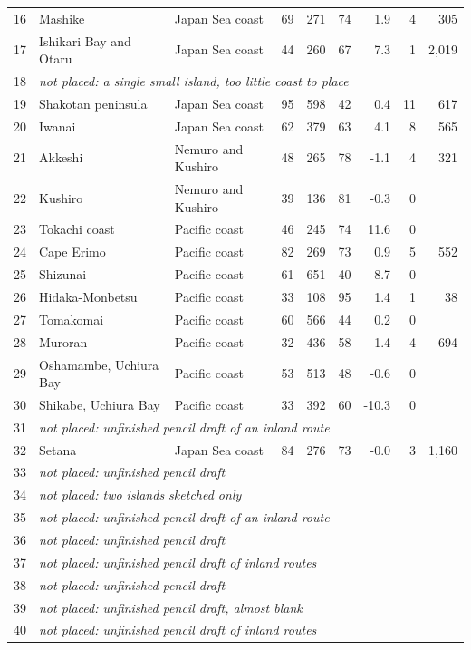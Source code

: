 \documentclass[11pt,a4paper]{article}
\begin{document}
{\begin{longtable}{rp{4.2cm}p{2.6cm}rrrrrr}
16 & Mashike & Japan Sea coast & 69 & 271 & 74 & 1.9 & 4 & 305\\
17 & Ishikari Bay and Otaru & Japan Sea coast & 44 & 260 & 67 & 7.3 & 1 & 2,019\\
18 & \multicolumn{8}{l}{\textit{not placed: a single small island, too little coast to place}}\\
19 & Shakotan peninsula & Japan Sea coast & 95 & 598 & 42 & 0.4 & 11 & 617\\
20 & Iwanai & Japan Sea coast & 62 & 379 & 63 & 4.1 & 8 & 565\\
21 & Akkeshi & Nemuro and Kushiro & 48 & 265 & 78 & -1.1 & 4 & 321\\
22 & Kushiro & Nemuro and Kushiro & 39 & 136 & 81 & -0.3 & 0 & \\
23 & Tokachi coast & Pacific coast & 46 & 245 & 74 & 11.6 & 0 & \\
24 & Cape Erimo & Pacific coast & 82 & 269 & 73 & 0.9 & 5 & 552\\
25 & Shizunai & Pacific coast & 61 & 651 & 40 & -8.7 & 0 & \\
26 & Hidaka-Monbetsu & Pacific coast & 33 & 108 & 95 & 1.4 & 1 & 38\\
27 & Tomakomai & Pacific coast & 60 & 566 & 44 & 0.2 & 0 & \\
28 & Muroran & Pacific coast & 32 & 436 & 58 & -1.4 & 4 & 694\\
29 & Oshamambe, Uchiura Bay & Pacific coast & 53 & 513 & 48 & -0.6 & 0 & \\
30 & Shikabe, Uchiura Bay & Pacific coast & 33 & 392 & 60 & -10.3 & 0 & \\
31 & \multicolumn{8}{l}{\textit{not placed: unfinished pencil draft of an inland route}}\\
32 & Setana & Japan Sea coast & 84 & 276 & 73 & -0.0 & 3 & 1,160\\
33 & \multicolumn{8}{l}{\textit{not placed: unfinished pencil draft}}\\
34 & \multicolumn{8}{l}{\textit{not placed: two islands sketched only}}\\
35 & \multicolumn{8}{l}{\textit{not placed: unfinished pencil draft of an inland route}}\\
36 & \multicolumn{8}{l}{\textit{not placed: unfinished pencil draft}}\\
37 & \multicolumn{8}{l}{\textit{not placed: unfinished pencil draft of inland routes}}\\
38 & \multicolumn{8}{l}{\textit{not placed: unfinished pencil draft}}\\
39 & \multicolumn{8}{l}{\textit{not placed: unfinished pencil draft, almost blank}}\\
40 & \multicolumn{8}{l}{\textit{not placed: unfinished pencil draft of inland routes}}\\
\bottomrule\end{longtable}}
\end{document}
